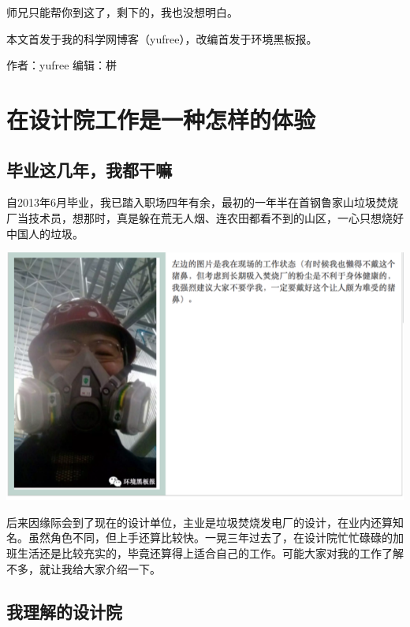 \documentclass[]{book}
\begin{document}
师兄只能帮你到这了，剩下的，我也没想明白。

本文首发于我的科学网博客（yufree），改编首发于环境黑板报。

作者：yufree
编辑：栟

\hypertarget{ux5728ux8bbeux8ba1ux9662ux5de5ux4f5cux662fux4e00ux79cdux600eux6837ux7684ux4f53ux9a8c}{%
\section{在设计院工作是一种怎样的体验}\label{ux5728ux8bbeux8ba1ux9662ux5de5ux4f5cux662fux4e00ux79cdux600eux6837ux7684ux4f53ux9a8c}}

\hypertarget{ux6bd5ux4e1aux8fd9ux51e0ux5e74ux6211ux90fdux5e72ux561b}{%
\subsection{毕业这几年，我都干嘛}\label{ux6bd5ux4e1aux8fd9ux51e0ux5e74ux6211ux90fdux5e72ux561b}}

自2013年6月毕业，我已踏入职场四年有余，最初的一年半在首钢鲁家山垃圾焚烧厂当技术员，想那时，真是躲在荒无人烟、连农田都看不到的山区，一心只想烧好中国人的垃圾。

\includegraphics[width=8.33in]{images/sisi1}

后来因缘际会到了现在的设计单位，主业是垃圾焚烧发电厂的设计，在业内还算知名。虽然角色不同，但上手还算比较快。一晃三年过去了，在设计院忙忙碌碌的加班生活还是比较充实的，毕竟还算得上适合自己的工作。可能大家对我的工作了解不多，就让我给大家介绍一下。

\hypertarget{ux6211ux7406ux89e3ux7684ux8bbeux8ba1ux9662}{%
\subsection{我理解的设计院}\label{ux6211ux7406ux89e3ux7684ux8bbeux8ba1ux9662}}
\end{document}
